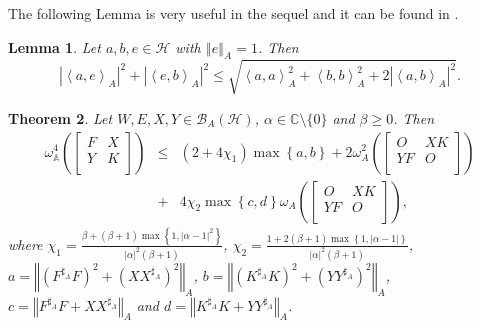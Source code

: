 \documentclass{article}
\newcommand{\bra}[1]{\left(#1\right)}
\newcommand{\seqA}[1]{{\left<#1\right>}_{A}}
\newcommand{\normA}[1]{{\left\Vert#1\right\Vert}_{A}}
\newcommand{\abs}[1]{\left\vert#1\right\vert}
\newcommand{\set}[1]{\left\{#1\right\}}
\renewcommand{\c}{\mathbb C}
\newcommand {\A}{\mathbb{A}}
\newcommand {\h}{\mathcal{H}}
\newcommand {\Xa}{X^{\sharp_{A}}}
\renewcommand {\b}{\mathcal{B}}
\newcommand {\Ya}{Y^{\sharp_{A}}}
\newcommand {\Ka}{K^{\sharp_{A}}}
\newcommand {\Fa}{F^{\sharp_{A}}}
\newtheorem{theorem}{Theorem}[section]
\newtheorem{lemma}[theorem]{Lemma}
\begin{document}
The following Lemma is very useful in the sequel and it can be found in \cite[Lemma 2.12]{KZ}.
\begin{lemma}\label{Drag} Let $a,b,e\in\h$ with $\normA{e}=1$. Then
$$\abs{\seqA{a,e}}^2+\abs{\seqA{e,b}}^2\leq \sqrt{\seqA{a,a}^2+\seqA{b,b}^2+2\abs{\seqA{a,b}}^2}.$$
\end{lemma}
\begin{theorem}\label{KZ} Let $W,E,X,Y\in\b_A(\h)$, $\alpha\in\c\setminus\{0\}$ and $\beta\geq 0$. Then
\begin{eqnarray}
  \omega_{\A}^4\bra{\begin{bmatrix} F& X\\ Y& K \\\end{bmatrix}}  &\leq& \bra{2+4\chi_1}\max\set{a,b}
  +2\omega_A^2\bra{\begin{bmatrix} O& XK\\ YF& O \\\end{bmatrix}}\nonumber\\
   &+&4\chi_2\max\set{c,d}\omega_A\bra{\begin{bmatrix} O& XK\\ YF& O \\\end{bmatrix}},
\end{eqnarray}
 where $\chi_1=\frac{\beta+(\beta+1)\max\set{1,\abs{\alpha-1}^2}}{\abs{\alpha}^2(\beta+1)}$,
$\chi_2=\frac{1+2(\beta+1)\max\set{1,\abs{\alpha-1}}}{\abs{\alpha}^2(\beta+1)}$, $a=\normA{(\Fa F)^2+(X\Xa)^2}$, $b=\normA{(\Ka K)^2+(Y\Ya)^2}$,
$c=\normA{\Fa F+X\Xa}$ and $d=\normA{\Ka K+Y\Ya}$.
\end{theorem}
\end{document}
